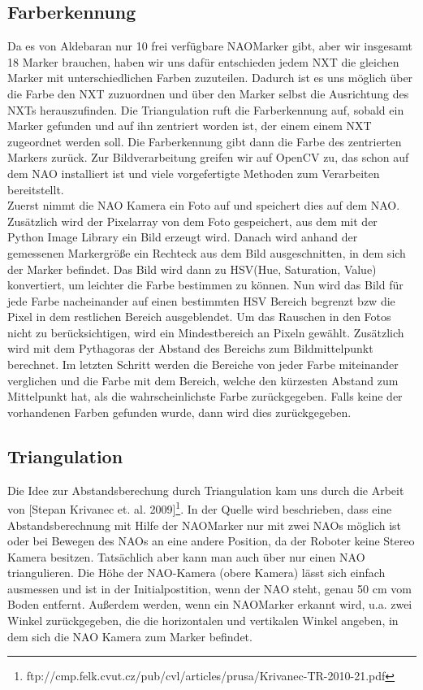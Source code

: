 \subsection{Farberkennung}
Da es von Aldebaran nur 10 frei verfügbare NAOMarker gibt, aber wir insgesamt 18 Marker brauchen, haben wir uns dafür entschieden jedem NXT die gleichen Marker mit unterschiedlichen Farben zuzuteilen. Dadurch ist es uns möglich über die Farbe den NXT zuzuordnen und über den Marker selbst die Ausrichtung des NXTs herauszufinden.
Die Triangulation ruft die Farberkennung auf, sobald ein Marker gefunden und auf ihn zentriert worden ist, der einem einem NXT zugeordnet werden soll. Die Farberkennung gibt dann die Farbe des zentrierten Markers zurück.
Zur Bildverarbeitung greifen wir auf OpenCV zu, das schon auf dem NAO installiert ist und viele vorgefertigte Methoden zum Verarbeiten bereitstellt.
\\
Zuerst nimmt die NAO Kamera ein Foto auf und speichert dies auf dem NAO. Zusätzlich wird der Pixelarray von dem Foto gespeichert, aus dem mit der Python Image Library ein Bild erzeugt wird. 
Danach wird anhand der gemessenen Markergröße ein Rechteck aus dem Bild ausgeschnitten, in dem sich der Marker befindet. Das Bild wird dann zu HSV(Hue, Saturation, Value) konvertiert, um leichter die Farbe bestimmen zu können.
Nun wird das Bild für jede Farbe nacheinander auf einen bestimmten HSV Bereich begrenzt bzw die Pixel in dem restlichen Bereich ausgeblendet. Um das Rauschen in den Fotos nicht zu berücksichtigen, wird ein Mindestbereich an Pixeln gewählt. Zusätzlich wird mit dem Pythagoras der Abstand des Bereichs zum Bildmittelpunkt berechnet. Im letzten Schritt werden die Bereiche von jeder Farbe miteinander verglichen und die Farbe mit dem Bereich, welche den kürzesten Abstand zum Mittelpunkt hat, als die wahrscheinlichste Farbe zurückgegeben. Falls keine der vorhandenen Farben gefunden wurde, dann wird dies zurückgegeben.


\subsection{Triangulation}
Die Idee zur Abstandsberechung durch Triangulation kam uns durch die Arbeit von [Stepan Krivanec et. al. 2009]\footnote{ftp://cmp.felk.cvut.cz/pub/cvl/articles/prusa/Krivanec-TR-2010-21.pdf}. In der Quelle wird beschrieben, dass eine Abstandsberechnung mit Hilfe der NAOMarker nur mit zwei NAOs möglich ist oder bei Bewegen des NAOs an eine andere Position, da der Roboter keine Stereo Kamera besitzen. Tatsächlich aber kann man auch über nur einen NAO triangulieren. Die Höhe der NAO-Kamera (obere Kamera) lässt sich einfach ausmessen und ist in der Initialpostition, wenn der NAO steht, genau 50 cm vom Boden entfernt. Außerdem werden, wenn ein NAOMarker erkannt wird, u.a. zwei Winkel zurückgegeben, die die horizontalen und vertikalen Winkel angeben, in dem sich die NAO Kamera zum Marker befindet.

